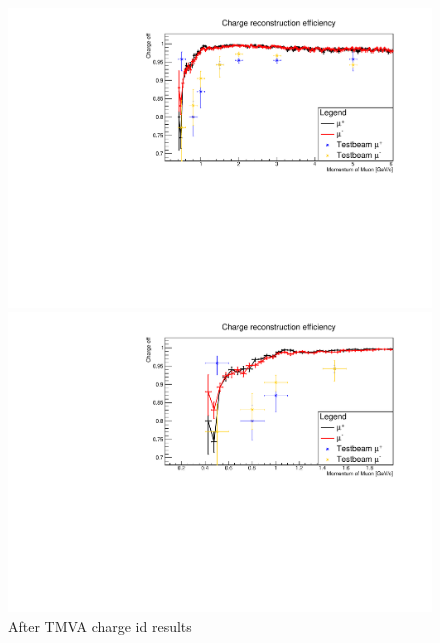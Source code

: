 \begin{figure}[h!]
\centering

\includegraphics[width=\textwidth]
{figures/TMVAnew/TMVAnewChargeIDFull.pdf}%

\includegraphics[width=\textwidth]{figures/TMVAnew/TMVAnewChargeIDLow.pdf}


\caption{After TMVA charge id results}
\label{fig:ChargeImproved}
\end{figure}


